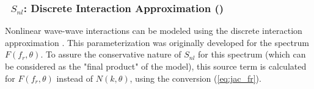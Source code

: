\vsssub
\subsubsection{~$S_{nl}$: Discrete Interaction Approximation (\dia)} \label{sec:NL1}
\vsssub


\noindent
Nonlinear wave-wave interactions can be modeled using the discrete interaction
approximation \citep[\dia,][]{art:Hea85b}. This parameterization was
originally developed for the spectrum $F(f_r ,\theta)$. To assure the
conservative nature of $S_{nl}$ for this spectrum (which can be considered as
the "final product" of the model), this source term is calculated for
$F(f_r,\theta)$ instead of $N(k,\theta)$, using the conversion
(\ref{eq:jac_fr}).


